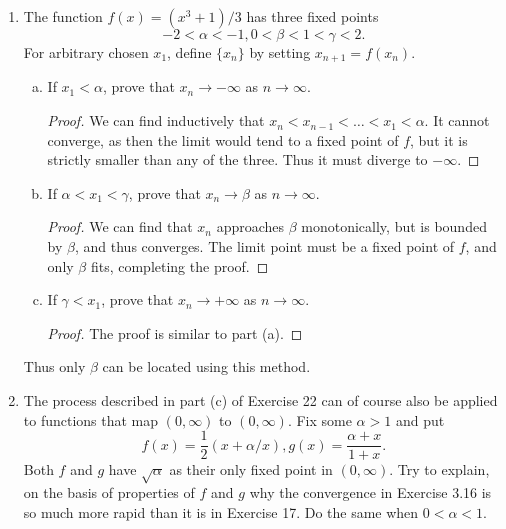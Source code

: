 \begin{enumerate}[1.]
\begin{enumerate}[(a)]
\begin{proof}
            Then, we have
            \[
                x := \lim_{n \to \infty} x_n = \lim_{n \to \infty} f(x_{n-1}) = f(x)
            \]
            since $f$ is differentiable and thus continuous, so $x = \lim x_n$ is a fixed point of $f$.
        \end{proof}
    \item Show that the process described in (c) can be visualized by the zig-zag path
        \[
            (x_1, x_2) \to (x_2, x_2) \to (x_2, x_3) \to (x_3, x_3) \to \dotsb.
        \]
        \begin{proof}
            It just can, draw it!
        \end{proof}
    \end{enumerate}
\item %
    The function $f(x) = (x^3 + 1)/3$ has three fixed points
    \[
        -2 < \alpha < -1, 0 < \beta < 1 < \gamma < 2.
    \]
    For arbitrary chosen $x_1$, define $\{x_n\}$ by setting $x_{n+1} = f(x_n)$.
    \begin{enumerate}[(a)] 
    \item If $x_1 < \alpha$, prove that $x_n \to -\infty$ as $n \to \infty$.
        \begin{proof}
            We can find inductively that $x_n < x_{n-1} < \dotsc < x_1 < \alpha$. It cannot converge, as then the limit would tend to a fixed point of $f$, but it is strictly smaller than any of the three. Thus it must diverge to $-\infty$.
        \end{proof}
    \item If $\alpha < x_1 < \gamma$, prove that $x_n \to \beta$ as $n \to \infty$.
        \begin{proof}
            We can find that $x_n$ approaches $\beta$ monotonically, but is bounded by $\beta$, and thus converges. The limit point must be a fixed point of $f$, and only $\beta$ fits, completing the proof.
        \end{proof}
    \item If $\gamma < x_1$, prove that $x_n \to +\infty$ as $n \to \infty$.
        \begin{proof}
            The proof is similar to part (a).
        \end{proof}
    \end{enumerate}
    Thus only $\beta$ can be located using this method.
\item %
    The process described in part (c) of Exercise 22 can of course also be applied to functions that map $(0, \infty)$ to $(0, \infty)$. Fix some $\alpha > 1$ and put
    \[
        f(x) = \frac{1}{2} \left( x + \alpha/x \right), g(x) = \frac{\alpha + x}{1 + x}.
    \]
    Both $f$ and $g$ have $\sqrt{\alpha}$ as their only fixed point in $(0, \infty)$. Try to explain, on the basis of properties of $f$ and $g$ why the convergence in Exercise 3.16 is so much more rapid than it is in Exercise 17. Do the same when $0 < \alpha < 1$.


\end{enumerate}
